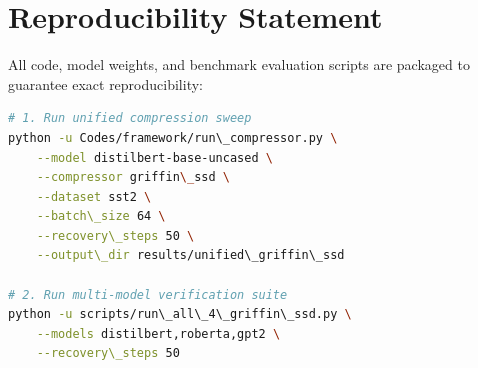 \section{Reproducibility Statement}
All code, model weights, and benchmark evaluation scripts are packaged to guarantee exact reproducibility:
\begin{lstlisting}[language=bash]
# 1. Run unified compression sweep
python -u Codes/framework/run\_compressor.py \
    --model distilbert-base-uncased \
    --compressor griffin\_ssd \
    --dataset sst2 \
    --batch\_size 64 \
    --recovery\_steps 50 \
    --output\_dir results/unified\_griffin\_ssd

# 2. Run multi-model verification suite
python -u scripts/run\_all\_4\_griffin\_ssd.py \
    --models distilbert,roberta,gpt2 \
    --recovery\_steps 50
\end{lstlisting}
